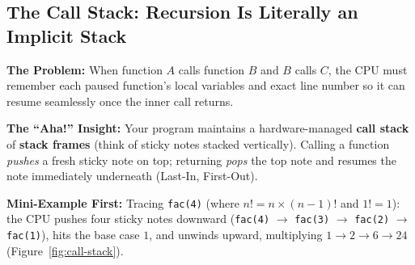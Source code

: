 \documentclass[11pt,a4paper]{article}
\theoremstyle{definition}
\newcommand{\painbeat}{\textbf{\color{accentamber}The Problem:} }
\newcommand{\ahabeat}{\textbf{\color{accentteal}The ``Aha!'' Insight:} }
\newcommand{\examplebeat}{\textbf{\color{primaryblue}Mini-Example First:} }
\begin{document}
\subsection{The Call Stack: Recursion Is Literally an Implicit Stack}

\painbeat When function $A$ calls function $B$ and $B$ calls $C$, the CPU must remember each paused function's local variables and exact line number so it can resume seamlessly once the inner call returns.

\ahabeat Your program maintains a hardware-managed \textbf{call stack} of \textbf{stack frames} (think of sticky notes stacked vertically). Calling a function \emph{pushes} a fresh sticky note on top; returning \emph{pops} the top note and resumes the note immediately underneath (Last-In, First-Out).

\examplebeat Tracing \texttt{fac(4)} (where $n! = n \times (n - 1)!$ and $1! = 1$): the CPU pushes four sticky notes downward (\texttt{fac(4)} $\to$ \texttt{fac(3)} $\to$ \texttt{fac(2)} $\to$ \texttt{fac(1)}), hits the base case $1$, and unwinds upward, multiplying $1 \to 2 \to 6 \to 24$ (Figure~\ref{fig:call-stack}).
\end{document}
